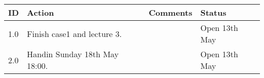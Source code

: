 \begin{center}
\begin{longtable}{| p{} | >{\raggedright\arraybackslash}p{} |  p{} | >{\raggedright\arraybackslash}p{}|} \hline
\textbf{ID} & \textbf{Action} & \textbf{Comments} & \textbf{Status} \\ \hline
\endhead
1.0	&	Finish case1 and lecture 3.	&	& Open 13th May \\ \hline
2.0	&	Handin Sunday 18th May 18:00.	&	&	Open 13th May \\ \hline
\end{longtable}
\end{center}

